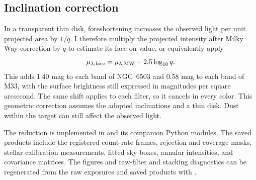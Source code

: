 \subsection{Inclination correction}
\label{sec:inclination}

In a transparent thin disk, foreshortening increases the observed light per unit projected area by $1/q$. I therefore multiply the projected intensity after Milky Way correction by $q$ to estimate its face-on value, or equivalently apply
\begin{equation}
    \mu_{\lambda,\rm face}=\mu_{\lambda,\rm MW}-2.5\log_{10}q.
    \label{eq:inclination}
\end{equation}
This adds 1.40 mag to each band of NGC~6503 and 0.58 mag to each band of M33, with the surface brightness still expressed in magnitudes per square arcsecond. The same shift applies to each filter, so it cancels in every color. This geometric correction assumes the adopted inclinations and a thin disk. Dust within the target can still affect the observed light.

The reduction is implemented in  and its companion Python modules. The saved products include the registered count-rate frames, rejection and coverage masks, stellar calibration measurements, fitted sky boxes, annular intensities, and covariance matrices. The figures and raw-filter and stacking diagnostics can be regenerated from the raw exposures and saved products with .
